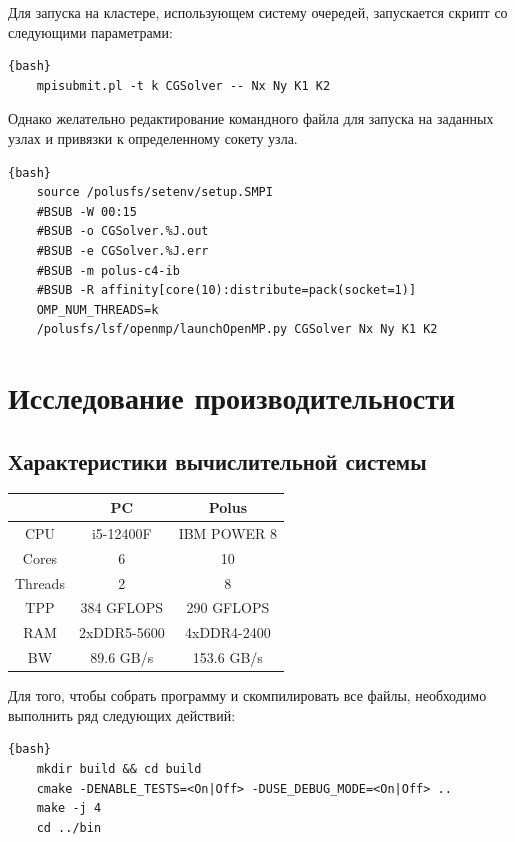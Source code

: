 \documentclass[12pt, a4paper]{article}
\begin{document}
Для запуска на кластере, использующем систему очередей, запускается скрипт со следующими параметрами:

\begin{lstlisting}{bash}
	mpisubmit.pl -t k CGSolver -- Nx Ny K1 K2
\end{lstlisting}

Однако желательно редактирование командного файла для запуска на заданных узлах и привязки к определенному сокету узла.

\begin{lstlisting}{bash}
	source /polusfs/setenv/setup.SMPI
	#BSUB -W 00:15
	#BSUB -o CGSolver.%J.out
	#BSUB -e CGSolver.%J.err
	#BSUB -m polus-c4-ib
	#BSUB -R affinity[core(10):distribute=pack(socket=1)]
	OMP_NUM_THREADS=k
	/polusfs/lsf/openmp/launchOpenMP.py CGSolver Nx Ny K1 K2
\end{lstlisting}


\newpage

\section{Исследование производительности}

\subsection{Характеристики вычислительной системы}

\begin{center}
	\setlength{\tabcolsep}{30pt}
	\renewcommand{\arraystretch}{1.5}
	\begin{tabular}{ c|c|c } 
		 & PC & Polus \\ 
		\hline
		CPU  & i5-12400F & IBM POWER 8 \\ 
		Cores & 6 & 10 \\ 
		Threads & 2 & 8 \\
		TPP & 384 GFLOPS & 290 GFLOPS \\
		RAM & 2xDDR5-5600  & 4xDDR4-2400 \\
		BW & 89.6 GB/s & 153.6 GB/s \\
	\end{tabular}
\end{center}

Для того, чтобы собрать программу и скомпилировать все файлы, необходимо выполнить ряд следующих действий:

\begin{lstlisting}{bash}
	mkdir build && cd build
	cmake -DENABLE_TESTS=<On|Off> -DUSE_DEBUG_MODE=<On|Off> ..
	make -j 4
	cd ../bin
\end{lstlisting}
\end{document}
